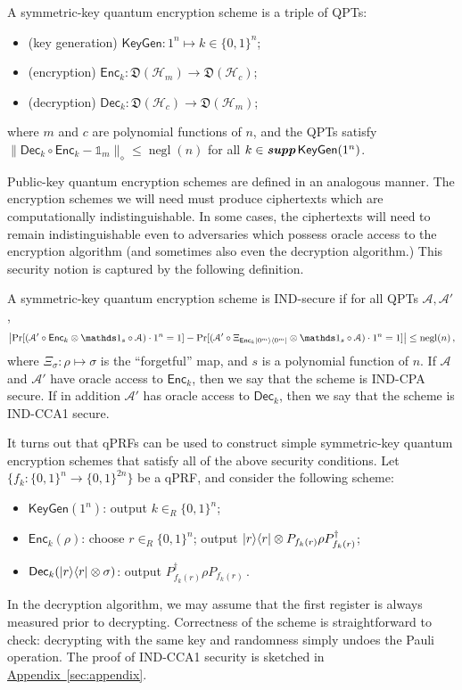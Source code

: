 \documentclass[envcountsame]{llncs}
\numberwithin{equation}{section}
\newcommand{\one}{\mathds 1}
\newcommand{\opn}{\operatorname}
\newcommand{\expref}[2]{\texorpdfstring{\hyperref[#2]{#1~\ref{#2}}}{#1~\ref{#2}}}
\newcommand{\algo}{\mathcal}
\newcommand{\negl}{\opn{negl}}
\newcommand{\KeyGen}{\ensuremath{\mathsf{KeyGen}}\xspace}
\newcommand{\Enc}{\ensuremath{\mathsf{Enc}}\xspace}
\newcommand{\Dec}{\ensuremath{\mathsf{Dec}}\xspace}
\newcommand{\inrand}{\in_R}
\newcommand{\prob}{\opn{Pr}}
\newcommand{\states}{\mathfrak D}
\newcommand\supp{\textbf{supp}}
\begin{document}
\begin{definition}\label{def:encryption-scheme}
A symmetric-key quantum encryption scheme is a triple of QPTs:
\begin{itemize}
\item (key generation) $\KeyGen : 1^n \longmapsto k \in \{0, 1\}^n$;
\item (encryption) $\Enc_k : \states (\mathcal H_m) \longrightarrow \states (\mathcal H_c)$;
\item (decryption) $\Dec_k : \states (\mathcal H_c) \longrightarrow \states (\mathcal H_m)$;
\end{itemize}
where $m$ and $c$ are polynomial functions of $n$, and the QPTs satisfy $\| \Dec_k \circ \Enc_k - \one_m \|_\diamond \leq \negl(n)$ for all $k \in \emph{\supp}\,\KeyGen(1^n)$.
\end{definition}

Public-key quantum encryption schemes are defined in an analogous manner. The encryption schemes we will need must produce ciphertexts which are computationally indistinguishable. In some cases, the ciphertexts will need to remain indistinguishable even to adversaries which possess oracle access to the encryption algorithm (and sometimes also even the decryption algorithm.) This security notion is captured by the following definition.

\begin{definition}\label{def:IND}
A symmetric-key quantum encryption scheme is IND-secure if for all QPTs $\algo A, \algo A'$,
$$
\left|\prob[ (\algo A' \circ \Enc_k \otimes \one_s \circ \algo A) \cdot 1^n = 1] -
\prob[ (\algo A' \circ \Xi_{\Enc_k \ket{0^m}\bra{0^m}} \otimes \one_s \circ \algo A) \cdot 1^n = 1] \right|
\leq \negl(n)\,,
$$ 
where $\Xi_\sigma: \rho \mapsto \sigma$ is the ``forgetful'' map, and $s$ is a polynomial function of $n$. If $\algo A$ and $\algo A'$ have oracle access to $\Enc_k$, then we say that the scheme is IND-CPA secure. If in addition $\algo A'$ has oracle access to $\Dec_k$, then we say that the scheme is IND-CCA1 secure.
\end{definition}

It turns out that qPRFs can be used to construct simple symmetric-key quantum encryption schemes that satisfy all of the above security conditions. Let $\{f_k : \{0, 1\}^n \rightarrow \{0, 1\}^{2n}\}$ be a qPRF, and consider the following scheme:
\begin{itemize}
\item $\KeyGen(1^n)$: output $k \inrand \{0, 1\}^n$;
\item $\Enc_k(\rho)$: choose $r \inrand \{0, 1\}^n$; output ${\left\vert{r}\right\rangle}{\left\langle{r}\right\vert} \otimes P_{f_k(r)} \rho P_{f_k(r)}^{\dagger}$;
\item $\Dec_k(\ket{r}\bra{r} \otimes \sigma)$: output  $P_{f_k(r)}^\dagger \rho P_{f_k(r)}$\,.
\end{itemize}
In the decryption algorithm, we may assume that the first register is always measured prior to decrypting. Correctness of the scheme is straightforward to check: decrypting with the same key and randomness simply undoes the Pauli operation. The proof of IND-CCA1 security is sketched in \expref{Appendix}{sec:appendix}.
\end{document}
